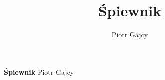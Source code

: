 \documentclass[draft]{article}
\title{Śpiewnik}
\author{Piotr Gajcy}
\begin{document}
  
\begin{titlepage}
   \begin{center}
	\Huge
    \vspace*{1cm}
    \textbf{Śpiewnik} \newline \newline \newline
    \vspace{0.5cm}
    \Large
    Piotr Gajcy           
    \vspace{1.5cm}
    \vfill
   \end{center}
   \footnotesize
\end{titlepage}
  
\newpage

\tableofcontents

\newpage
\end{document}
